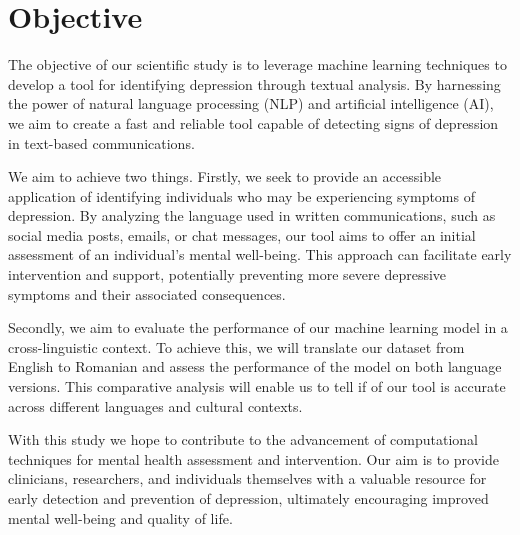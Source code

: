 \section{Objective}
\label{sec:ch1sec2}

The objective of our scientific study is to leverage machine learning techniques to develop a tool for identifying depression through textual analysis. By harnessing the power of natural language processing (NLP) and artificial intelligence (AI), we aim to create a fast and reliable tool capable of detecting signs of depression in text-based communications.

We aim to achieve two things. Firstly, we seek to provide an accessible application of identifying individuals who may be experiencing symptoms of depression. By analyzing the language used in written communications, such as social media posts, emails, or chat messages, our tool aims to offer an initial assessment of an individual's mental well-being. This approach can facilitate early intervention and support, potentially preventing more severe depressive symptoms and their associated consequences.

Secondly, we aim to evaluate the performance of our machine learning model in a cross-linguistic context. To achieve this, we will translate our dataset from English to Romanian and assess the performance of the model on both language versions. This comparative analysis will enable us to tell if of our tool is accurate across different languages and cultural contexts.

With this study we hope to contribute to the advancement of computational techniques for mental health assessment and intervention. Our aim is to provide clinicians, researchers, and individuals themselves with a valuable resource for early detection and prevention of depression, ultimately encouraging improved mental well-being and quality of life.
